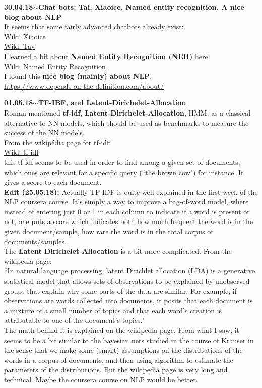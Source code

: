 \documentclass[11pt,a4paper]{article}
\newenvironment{loggentry}[2]%
{\noindent\textbf{#1}\hspace{1cm}$\mathbf{\sim}$\text{ }\textbf{#2}\\}{\vspace{0.5cm}}
\begin{document}
\begin{loggentry}{30.04.18}{Chat bots: Tai, Xiaoice, Named entity recognition, A nice blog about NLP}
It seems that some fairly advanced chatbots already exist:\\
\href{https://en.wikipedia.org/wiki/Xiaoice}{Wiki: Xiaoice}\\
\href{https://en.wikipedia.org/wiki/Tay_(bot)}{Wiki: Tay}\\
I learned a bit about \textbf{Named Entity Recognition (NER)} here:\\
\href{https://en.wikipedia.org/wiki/Named-entity_recognition}{Wiki: Named Entity Recognition}\\
I found this \textbf{nice blog (mainly) about NLP}:\\
\url{https://www.depends-on-the-definition.com/about/}\\
\end{loggentry}

\begin{loggentry}{01.05.18}{TF-IBF, and Latent-Dirichelet-Allocation}
Roman mentioned \textbf{tf-idf}, \textbf{Latent-Dirichelet-Allocation}, HMM, as a classical alternative to NN models, which should be used as benchmarks to measure the success of the NN models.\\
From the wikipédia page for tf-idf:\\
\href{https://en.wikipedia.org/wiki/Tf-idf}{Wiki: tf-idf}\\
this tf-idf seems to be used in order to find among a given set of documents, which ones are relevant for a specific query (``the brown cow") for instance. It gives a score to each document.\\
\textbf{Edit (25.05.18):} Actually TF-IDF is quite well explained in the first week of the NLP coursera course. It's simply a way to improve a bag-of-word model, where instead of entering just 0 or 1 in each column to indicate if a word is present or not, one puts a score which indicates both how much frequent the word is in the given document/sample, how rare the word is in the total corpus of documents/samples.\\

The \textbf{Latent Dirichelet Allocation} is a bit more complicated. From the wikipedia page:\\
``In natural language processing, latent Dirichlet allocation (LDA) is a generative statistical model that allows sets of observations to be explained by unobserved groups that explain why some parts of the data are similar. For example, if observations are words collected into documents, it posits that each document is a mixture of a small number of topics and that each word's creation is attributable to one of the document's topics."\\
The math behind it is explained on the wikipedia page. From what I saw, it seems to be a bit similar to the bayesian nets studied in the course of Krauser in the sense that we make some (smart) assumptions on the distributions of the words in a corpus of documents, and then using algorithm to estimate the parameters of the distributions. But the wikipedia page is very long and technical. Maybe the coursera course on NLP would be better.
\end{loggentry}
\end{document}
